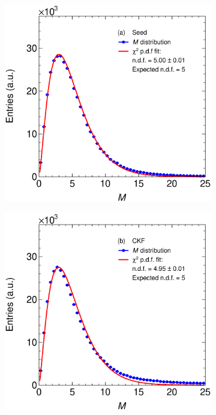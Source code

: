 \begin{figure}[!ht]
     \centering
     \begin{subfigure}[b]{0.48\textwidth}
         \centering
         \includegraphics[width=\textwidth]{figures/ch5-KF_NDGAr/ToySample/ParScan/MDistanceSeed.eps}
         \caption{}
         \label{fig:chi2Seed}
     \end{subfigure}
     \begin{subfigure}[b]{0.48\textwidth}
         \centering
         \includegraphics[width=\textwidth]{figures/ch5-KF_NDGAr/ToySample/ParScan/MDistanceKalman.eps}

\end{subfigure}
\end{figure}
